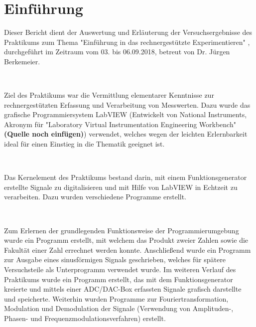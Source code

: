 \section{Einführung}

	
Dieser Bericht dient der Auswertung und Erläuterung der Versuchsergebnisse des Praktikums zum Thema  "Einführung in das rechnergestützte Experimentieren" , durchgeführt im Zeitraum vom 03. bis 06.09.2018, betreut von Dr. Jürgen Berkemeier.
	
\
	
Ziel des Praktikums war die Vermittlung elementarer Kenntnisse zur rechnergestützten Erfassung und Verarbeitung von Messwerten. Dazu wurde das grafische Programmiersystem LabVIEW (Entwickelt von National Instruments, Akronym für "Laboratory Virtual Instrumentation Engineering Workbench" \textbf{(Quelle noch einfügen)}) verwendet, welches wegen der leichten Erlernbarkeit ideal für einen Einstieg in die Thematik geeignet ist. %

\

Das Kernelement des Praktikums bestand darin, mit einem Funktionsgenerator erstellte Signale zu digitalisieren und mit Hilfe von LabVIEW in Echtzeit zu verarbeiten. Dazu wurden verschiedene Programme erstellt.

\

Zum Erlernen der grundlegenden Funktionsweise der Programmierumgebung wurde ein Programm erstellt, mit welchem das Produkt zweier Zahlen sowie die Fakultät einer Zahl errechnet werden konnte. Anschließend wurde ein Programm zur Ausgabe eines sinusförmigen Signals geschrieben, welches für spätere Versuchsteile als Unterprogramm verwendet wurde. Im weiteren Verlauf des Praktikums wurde ein Programm erstellt, das mit dem Funktionsgenerator kreierte und mittels einer ADC/DAC-Box erfassten Signale grafisch darstellte und speicherte. Weiterhin wurden Programme zur Fouriertransformation, Modulation und Demodulation der Signale (Verwendung von Amplituden-, Phasen- und Frequenzmodulationsverfahren) erstellt.
